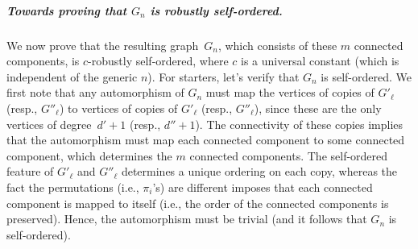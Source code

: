 \documentclass[10pt,a4paper]{article}
\theoremstyle{definition}
\newcommand{\mypar}[1]{\subparagraph{{#1}}}
\begin{document}
%
%
%
%
%
%

\mypar{Towards proving that $G_n$ is robustly self-ordered.}
We now prove that the resulting graph~$G_n$,
which consists of these $m$ connected components,
is $c$-robustly self-ordered, where $c$ is a universal constant
(which is independent of the generic $n$).
For starters, let's verify that $G_n$ is self-ordered.
We first note that any automorphism of $G_n$ must
map the vertices of copies of $G'_\ell$ (resp., $G''_\ell$)
to vertices of copies of $G'_\ell$ (resp., $G''_\ell$),
since these are the only vertices of degree~$d'+1$ (resp., $d''+1$).
The connectivity of these copies implies that
the automorphism must map each connected component
to some connected component,
which  determines the $m$ connected components.
The self-ordered feature of $G'_\ell$ and $G''_\ell$
determines a unique ordering on each copy,
whereas the fact the permutations (i.e., $\pi_i$'s)
are different imposes that each connected
component is mapped to itself
(i.e., the order of the connected components is preserved).
Hence, the automorphism must be trivial
(and it follows that $G_n$ is self-ordered).

%
%
%
%
%
%
%
%
%
%
%
\end{document}
